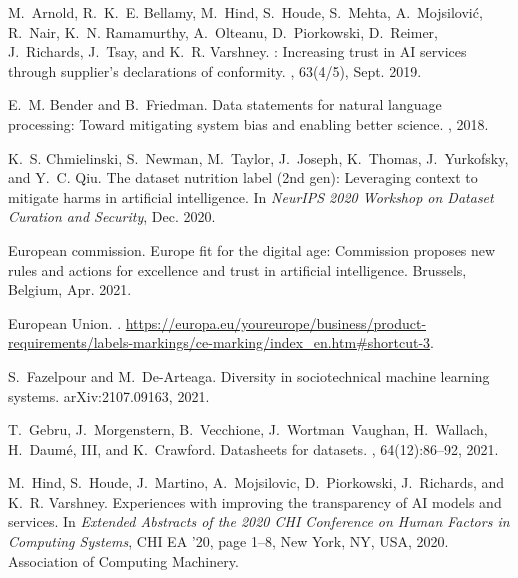 \documentclass[11pt,dvipdfm]{article}
\begin{document}
\begin{thebibliography}{10}

M.~Arnold, R.~K.~E. Bellamy, M.~Hind, S.~Houde, S.~Mehta, A.~Mojsilovi{\'c},
  R.~Nair, K.~N. Ramamurthy, A.~Olteanu, D.~Piorkowski, D.~Reimer, J.~Richards,
  J.~Tsay, and K.~R. Varshney.
: Increasing trust in {AI} services through supplier’s
  declarations of conformity.
, 63(4/5), Sept. 2019.

E.~M. Bender and B.~Friedman.
\newblock Data statements for natural language processing: Toward mitigating
  system bias and enabling better science.
,
  2018.

K.~S. Chmielinski, S.~Newman, M.~Taylor, J.~Joseph, K.~Thomas, J.~Yurkofsky,
  and Y.~C. Qiu.
\newblock The dataset nutrition label (2nd gen): Leveraging context to mitigate
  harms in artificial intelligence.
\newblock In {\em NeurIPS 2020 Workshop on Dataset Curation and Security}, Dec.
  2020.

{European commission}.
\newblock Europe fit for the digital age: Commission proposes new rules and
  actions for excellence and trust in artificial intelligence.
\newblock Brussels, Belgium, Apr. 2021.

{European Union}.
.
\newblock
  \url{https://europa.eu/youreurope/business/product-requirements/labels-markings/ce-marking/index_en.htm#shortcut-3}.

S.~Fazelpour and M.~De-Arteaga.
\newblock Diversity in sociotechnical machine learning systems.
\newblock arXiv:2107.09163, 2021.

T.~Gebru, J.~Morgenstern, B.~Vecchione, J.~Wortman~Vaughan, H.~Wallach,
  H.~Daum{\'e}, {III}, and K.~Crawford.
\newblock Datasheets for datasets.
, 64(12):86--92, 2021.

M.~Hind, S.~Houde, J.~Martino, A.~Mojsilovic, D.~Piorkowski, J.~Richards, and
  K.~R. Varshney.
\newblock Experiences with improving the transparency of {AI} models and
  services.
\newblock In {\em Extended Abstracts of the 2020 CHI Conference on Human
  Factors in Computing Systems}, CHI EA ’20, page 1–8, New York, NY, USA,
  2020. Association of Computing Machinery.


\end{thebibliography}
\end{document}
